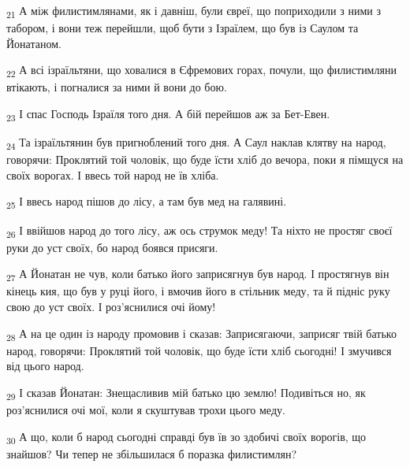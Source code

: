 \begin{tcolorbox}
\textsubscript{21} А між филистимлянами, як і давніш, були євреї, що поприходили з ними з табором, і вони теж перейшли, щоб бути з Ізраїлем, що був із Саулом та Йонатаном.
\end{tcolorbox}
\begin{tcolorbox}
\textsubscript{22} А всі ізраїльтяни, що ховалися в Єфремових горах, почули, що филистимляни втікають, і погналися за ними й вони до бою.
\end{tcolorbox}
\begin{tcolorbox}
\textsubscript{23} І спас Господь Ізраїля того дня. А бій перейшов аж за Бет-Евен.
\end{tcolorbox}
\begin{tcolorbox}
\textsubscript{24} Та ізраїльтянин був пригноблений того дня. А Саул наклав клятву на народ, говорячи: Проклятий той чоловік, що буде їсти хліб до вечора, поки я пімщуся на своїх ворогах. І ввесь той народ не їв хліба.
\end{tcolorbox}
\begin{tcolorbox}
\textsubscript{25} І ввесь народ пішов до лісу, а там був мед на галявині.
\end{tcolorbox}
\begin{tcolorbox}
\textsubscript{26} І ввійшов народ до того лісу, аж ось струмок меду! Та ніхто не простяг своєї руки до уст своїх, бо народ боявся присяги.
\end{tcolorbox}
\begin{tcolorbox}
\textsubscript{27} А Йонатан не чув, коли батько його заприсягнув був народ. І простягнув він кінець кия, що був у руці його, і вмочив його в стільник меду, та й підніс руку свою до уст своїх. І роз'яснилися очі йому!
\end{tcolorbox}
\begin{tcolorbox}
\textsubscript{28} А на це один із народу промовив і сказав: Заприсягаючи, заприсяг твій батько народ, говорячи: Проклятий той чоловік, що буде їсти хліб сьогодні! І змучився від цього народ.
\end{tcolorbox}
\begin{tcolorbox}
\textsubscript{29} І сказав Йонатан: Знещасливив мій батько цю землю! Подивіться но, як роз'яснилися очі мої, коли я скуштував трохи цього меду.
\end{tcolorbox}
\begin{tcolorbox}
\textsubscript{30} А що, коли б народ сьогодні справді був їв зо здобичі своїх ворогів, що знайшов? Чи тепер не збільшилася б поразка филистимлян?
\end{tcolorbox}
